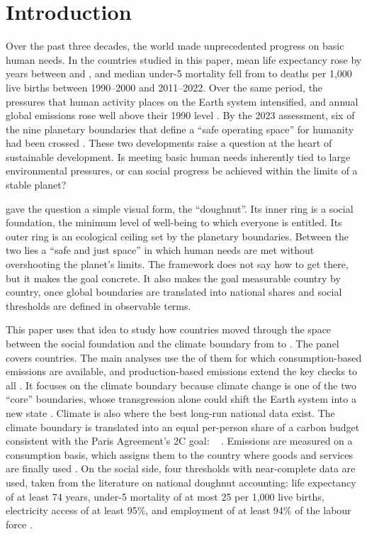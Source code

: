 \section{Introduction}\label{sec:intro}

Over the past three decades, the world made unprecedented progress on basic human needs. In the countries studied in this paper, mean life expectancy rose by \nLeGain{} years between \nShareYearStart{} and \nLastYear, and median under-5 mortality fell from \nDescUFirst{} to \nDescULast{} deaths per 1{,}000 live births between 1990--2000 and 2011--2022. Over the same period, the pressures that human activity places on the Earth system intensified, and annual global \COtwo{} emissions rose well above their 1990 level \citep{friedlingstein2026}. By the 2023 assessment, six of the nine planetary boundaries that define a ``safe operating space'' for humanity had been crossed \citep{rockstrom2009,steffen2015,richardson2023}. These two developments raise a question at the heart of sustainable development. Is meeting basic human needs inherently tied to large environmental pressures, or can social progress be achieved within the limits of a stable planet?

\citet{raworth2012,raworth2017} gave the question a simple visual form, the ``doughnut''. Its inner ring is a social foundation, the minimum level of well-being to which everyone is entitled. Its outer ring is an ecological ceiling set by the planetary boundaries. Between the two lies a ``safe and just space'' in which human needs are met without overshooting the planet's limits. The framework does not say how to get there, but it makes the goal concrete. It also makes the goal measurable country by country, once global boundaries are translated into national shares and social thresholds are defined in observable terms.

This paper uses that idea to study how countries moved through the space between the social foundation and the climate boundary from \nFirstYear{} to \nLastYear. The panel covers \nNCountries{} countries. The main analyses use the \nNCons{} of them for which consumption-based emissions are available, and production-based emissions extend the key checks to all \nNCountries. It focuses on the climate boundary because climate change is one of the two ``core'' boundaries, whose transgression alone could shift the Earth system into a new state \citep{steffen2015}. Climate is also where the best long-run national data exist. The climate boundary is translated into an equal per-person share of a carbon budget consistent with the Paris Agreement's 2\textdegree C goal: \nBoundary~\tpc{} \citep{oneill2018}. Emissions are measured on a consumption basis, which assigns them to the country where goods and services are finally used \citep{peters2011,friedlingstein2026}. On the social side, four thresholds with near-complete data are used, taken from the literature on national doughnut accounting: life expectancy of at least 74 years, under-5 mortality of at most 25 per 1{,}000 live births, electricity access of at least 95\%, and employment of at least 94\% of the labour force \citep{fanning2022,un2015sdg}.

